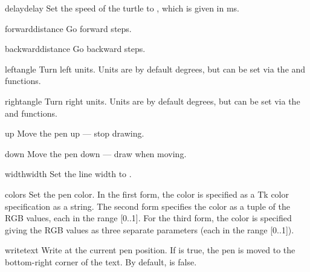 \begin{funcdesc}{delay}{delay}
Set the speed of the turtle to , which is given
in ms. 
\end{funcdesc}

\begin{funcdesc}{forward}{distance}
Go forward  steps.
\end{funcdesc}

\begin{funcdesc}{backward}{distance}
Go backward  steps.
\end{funcdesc}

\begin{funcdesc}{left}{angle}
Turn left  units. Units are by default degrees, but can be
set via the  and  functions.
\end{funcdesc}

\begin{funcdesc}{right}{angle}
Turn right  units. Units are by default degrees, but can be
set via the  and  functions.
\end{funcdesc}

\begin{funcdesc}{up}{}
Move the pen up --- stop drawing.
\end{funcdesc}

\begin{funcdesc}{down}{}
Move the pen down --- draw when moving.
\end{funcdesc}

\begin{funcdesc}{width}{width}
Set the line width to .
\end{funcdesc}

\begin{funcdesc}{color}{s}
Set the pen color.  In the first form, the color is specified as a
Tk color specification as a string.  The second form specifies the
color as a tuple of the RGB values, each in the range [0..1].  For the
third form, the color is specified giving the RGB values as three
separate parameters (each in the range [0..1]).
\end{funcdesc}

\begin{funcdesc}{write}{text}
Write  at the current pen position. If  is true,
the pen is moved to the bottom-right corner of the text. By default,
 is false.
\end{funcdesc}


